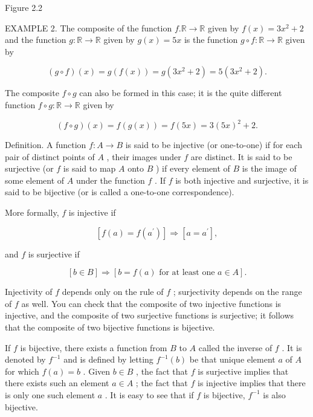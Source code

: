 \documentclass[10pt]{article}
\begin{document}
Figure 2.2

EXAMPLE 2. The composite of the function \(f.\mathbb{R} \rightarrow  \mathbb{R}\) given by \(f\left( x\right)  = 3{x}^{2} + 2\) and the function \(g : \mathbb{R} \rightarrow  \mathbb{R}\) given by \(g\left( x\right)  = {5x}\) is the function \(g \circ  f : \mathbb{R} \rightarrow  \mathbb{R}\) given by

\[
\left( {g \circ  f}\right) \left( x\right)  = g\left( {f\left( x\right) }\right)  = g\left( {3{x}^{2} + 2}\right)  = 5\left( {3{x}^{2} + 2}\right) .
\]

The composite \(f \circ  g\) can also be formed in this case; it is the quite different function \(f \circ  g : \mathbb{R} \rightarrow  \mathbb{R}\) given by

\[
\left( {f \circ  g}\right) \left( x\right)  = f\left( {g\left( x\right) }\right)  = f\left( {5x}\right)  = 3{\left( 5x\right) }^{2} + 2.
\]

Definition. A function \(f : A \rightarrow  B\) is said to be injective (or one-to-one) if for each pair of distinct points of \(A\) , their images under \(f\) are distinct. It is said to be surjective (or \(f\) is said to map \(A\) onto \(B\) ) if every element of \(B\) is the image of some element of \(A\) under the function \(f\) . If \(f\) is both injective and surjective, it is said to be bijective (or is called a one-to-one correspondence).

More formally, \(f\) is injective if

\[
\left\lbrack  {f\left( a\right)  = f\left( {a}^{\prime }\right) }\right\rbrack   \Rightarrow  \left\lbrack  {a = {a}^{\prime }}\right\rbrack  ,
\]

and \(f\) is surjective if

\[
\left\lbrack  {b \in  B}\right\rbrack   \Rightarrow  \left\lbrack  {b = f\left( a\right) \text{ for at least one }a \in  A}\right\rbrack  .
\]

Injectivity of \(f\) depends only on the rule of \(f\) ; surjectivity depends on the range of \(f\) as well. You can check that the composite of two injective functions is injective, and the composite of two surjective functions is surjective; it follows that the composite of two bijective functions is bijective.

If \(f\) is bijective, there exists a function from \(B\) to \(A\) called the inverse of \(f\) . It is denoted by \({f}^{-1}\) and is defined by letting \({f}^{-1}\left( b\right)\) be that unique element \(a\) of \(A\) for which \(f\left( a\right)  = b\) . Given \(b \in  B\) , the fact that \(f\) is surjective implies that there exists such an element \(a \in  A\) ; the fact that \(f\) is injective implies that there is only one such element \(a\) . It is easy to see that if \(f\) is bijective, \({f}^{-1}\) is also bijective.
\end{document}
